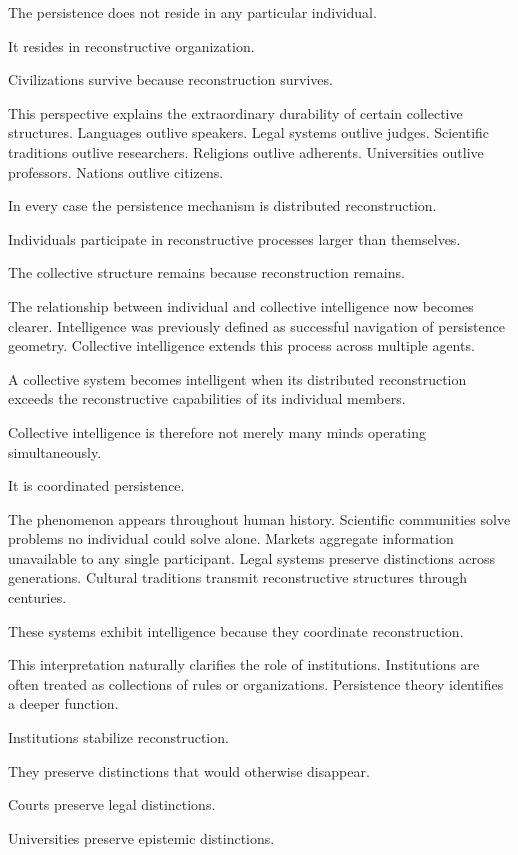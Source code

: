 \documentclass[12pt,oneside]{article}
\theoremstyle{definition}
\begin{document}
The persistence does not reside in any particular individual.

It resides in reconstructive organization.

Civilizations survive because reconstruction survives.

This perspective explains the extraordinary durability of certain collective structures. Languages outlive speakers. Legal systems outlive judges. Scientific traditions outlive researchers. Religions outlive adherents. Universities outlive professors. Nations outlive citizens.

In every case the persistence mechanism is distributed reconstruction.

Individuals participate in reconstructive processes larger than themselves.

The collective structure remains because reconstruction remains.

The relationship between individual and collective intelligence now becomes clearer. Intelligence was previously defined as successful navigation of persistence geometry. Collective intelligence extends this process across multiple agents.

A collective system becomes intelligent when its distributed reconstruction exceeds the reconstructive capabilities of its individual members.

Collective intelligence is therefore not merely many minds operating simultaneously.

It is coordinated persistence.

The phenomenon appears throughout human history. Scientific communities solve problems no individual could solve alone. Markets aggregate information unavailable to any single participant. Legal systems preserve distinctions across generations. Cultural traditions transmit reconstructive structures through centuries.

These systems exhibit intelligence because they coordinate reconstruction.

This interpretation naturally clarifies the role of institutions. Institutions are often treated as collections of rules or organizations. Persistence theory identifies a deeper function.

Institutions stabilize reconstruction.

They preserve distinctions that would otherwise disappear.

Courts preserve legal distinctions.

Universities preserve epistemic distinctions.
\end{document}
